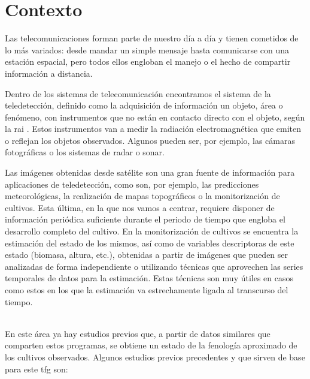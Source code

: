 \section{Contexto}
\par Las telecomunicaciones forman parte de nuestro día a día y tienen cometidos de lo más variados: desde mandar un simple mensaje hasta comunicarse con una estación espacial, pero todos ellos engloban el manejo o el hecho de compartir información a distancia. 
\\
\par Dentro de los sistemas de telecomunicación encontramos el sistema de la teledetección, definido como la adquisición de información un objeto, área o fenómeno, con instrumentos que no están en contacto directo con el objeto, según la \gls{rai} \cite{RAI}. Estos instrumentos van a medir la radiación electromagnética que emiten o reflejan los objetos observados. Algunos pueden ser, por ejemplo, las cámaras fotográficas o los sistemas de radar o sonar.
\\
\par Las imágenes obtenidas desde satélite son una gran fuente de información para aplicaciones de teledetección, como son, por ejemplo, las predicciones meteorológicas, la realización de mapas topográficos o la monitorización de cultivos. Esta última, en la que nos vamos a centrar, requiere disponer de información periódica suficiente durante el periodo de tiempo que engloba el desarrollo completo del cultivo. En la monitorización de cultivos se encuentra la estimación del estado de los mismos, así como de variables descriptoras de este estado (biomasa, altura, etc.), obtenidas a partir de imágenes que pueden ser analizadas de forma independiente o utilizando técnicas que aprovechen las series temporales de datos para la estimación. Estas técnicas son muy útiles en casos como estos en los que la estimación va estrechamente ligada al transcurso del tiempo. 
\\
\\
\par En este área ya hay estudios previos que, a partir de datos similares que comparten estos programas, se obtiene un estado de la fenología aproximado de los cultivos observados. Algunos estudios previos precedentes y que sirven de base para este \gls{tfg} son:
\\
